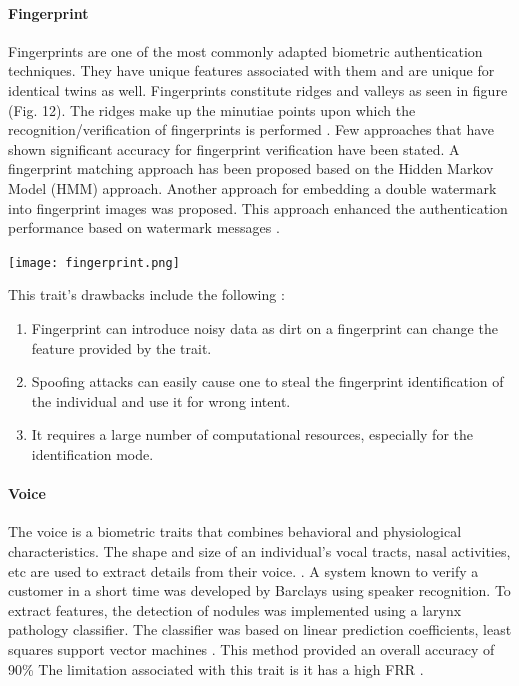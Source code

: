 \documentclass[a4paper, 12pt]{article}
\begin{document}
\paragraph{Fingerprint}
Fingerprints are one of the most commonly adapted biometric authentication techniques. They have unique features associated with them and are unique for identical twins as well. Fingerprints constitute ridges and valleys as seen in figure (Fig. 12). The ridges make up the minutiae points upon which the recognition/verification of fingerprints is performed \cite{bashir:2015}.
\vskip 0.2in
\noindent Few approaches that have shown significant accuracy for fingerprint verification have been stated. A fingerprint matching approach has been proposed based on the Hidden Markov Model (HMM) approach. Another approach for embedding a double watermark into fingerprint images was proposed. This approach enhanced the authentication performance based on watermark messages \cite{oloyede:2016}.
\vskip 0.2in
\begin{center}
\texttt{[image: fingerprint.png]}
\end{center}
\vskip 0.2in
\noindent This trait's drawbacks include the following \cite{jain:2004}: 
\begin{enumerate}
    \item Fingerprint can introduce noisy data as dirt on a fingerprint can change the feature provided by the trait.
    \item Spoofing attacks can easily cause one to steal the fingerprint identification of the individual and use it for wrong intent.
    \item It requires a large number of computational resources, especially for the identification mode.
\end{enumerate}
\vskip 0.2in
\paragraph{Voice}
The voice is a biometric traits that combines behavioral and physiological characteristics. The shape and size of an individual's vocal tracts, nasal activities, etc are used to extract details from their voice. \cite{jain:2004}. 
\vskip 0.2in
\noindent A system known to verify a customer in a short time was developed by Barclays using speaker recognition. To extract features, the detection of nodules was implemented using a larynx pathology classifier. The classifier was based on linear prediction coefficients, least squares support vector machines \cite{oloyede:2016}. This method provided an overall accuracy of 90\% The limitation associated with this trait is it has a high FRR \cite{bashir:2015}. 
\vskip 0.2in
\end{document}
